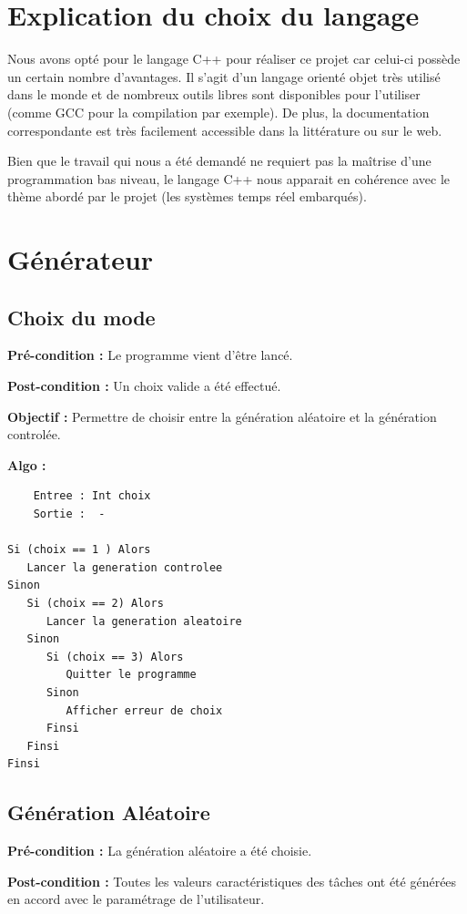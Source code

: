	\section{Explication du choix du langage}
		\label{sec:langage}
		Nous avons opté pour le langage C++ pour réaliser ce projet car celui-ci possède un certain nombre d'avantages. Il s'agit d'un langage orienté objet très utilisé dans le monde et de nombreux outils libres sont disponibles pour l'utiliser (comme GCC pour la compilation par exemple). De plus, la documentation correspondante est très facilement accessible dans la littérature ou sur le web.
	
		Bien que le travail qui nous a été demandé ne requiert pas la maîtrise d'une programmation bas niveau, le langage C++ nous apparait en cohérence avec le thème abordé par le projet (les systèmes temps réel embarqués).
		
	\section{Générateur}
		\subsection{Choix du mode}
			\textbf{Pré-condition :} Le programme vient d’être lancé.
			
			\textbf{Post-condition :} Un choix valide a été effectué.
			
			\textbf{Objectif :} Permettre de choisir entre la génération aléatoire et la génération controlée.
			
			\textbf{Algo :}
			\begin{lstlisting} 
	Entree : Int choix
	Sortie :  -

Si (choix == 1 ) Alors
   Lancer la generation controlee
Sinon
   Si (choix == 2) Alors
	  Lancer la generation aleatoire 
   Sinon
	  Si (choix == 3) Alors
	     Quitter le programme
	  Sinon
	     Afficher erreur de choix 
	  Finsi
   Finsi
Finsi
		\end{lstlisting} 

	\newpage
		\subsection{Génération Aléatoire}
			\textbf{Pré-condition :} La génération aléatoire a été choisie.
		
			\textbf{Post-condition :} Toutes les valeurs caractéristiques des tâches ont été générées en accord avec le paramétrage de l’utilisateur.

